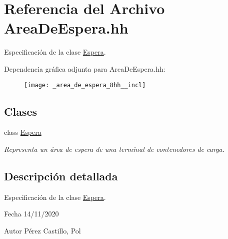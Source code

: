 \hypertarget{_area_de_espera_8hh}{}\section{Referencia del Archivo Area\+De\+Espera.\+hh}
\label{_area_de_espera_8hh}


Especificación de la clase \hyperlink{class_espera}{Espera}.  


Dependencia gráfica adjunta para Area\+De\+Espera.\+hh\+:\nopagebreak
\begin{figure}[H]
\begin{center}
\leavevmode
\texttt{[image: \_area\_de\_espera\_8hh\_\_incl]}
\end{center}
\end{figure}
\subsection*{Clases}
\begin{DoxyCompactItemize}
\item 
class \hyperlink{class_espera}{Espera}
\begin{DoxyCompactList}\small\item\em Representa un área de espera de una terminal de contenedores de carga. \end{DoxyCompactList}\end{DoxyCompactItemize}


\subsection{Descripción detallada}
Especificación de la clase \hyperlink{class_espera}{Espera}. 

\begin{DoxyDate}{Fecha}
14/11/2020 
\end{DoxyDate}
\begin{DoxyAuthor}{Autor}
Pérez Castillo, Pol 
\end{DoxyAuthor}
